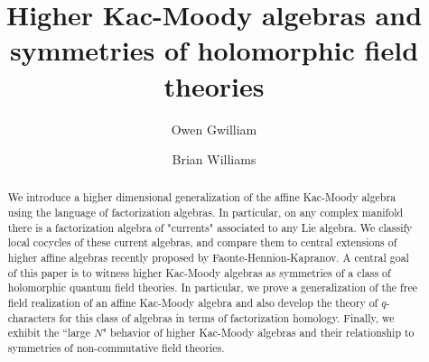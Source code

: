 \documentclass[11pt]{amsart}
\numberwithin{equation}{section}
\begin{document}
\title{Higher Kac-Moody algebras and symmetries of holomorphic field theories}

\author{Owen Gwilliam}
\address{Department of Mathematics and Statistics \\
Lederle Graduate Research Tower, 1623D \\
University of Massachusetts Amherst \\
710 N. Pleasant Street}

\author{Brian Williams}
\address{Department of Mathematics, 
Northeastern University \\ 
567 Lake Hall \\ 
Boston, MA 02115 \\ U.S.A.}


\begin{abstract}
We introduce a higher dimensional generalization of the affine Kac-Moody algebra using the language of factorization algebras. 
In particular, on any complex manifold there is a factorization algebra of "currents" associated to any Lie algebra. 
We classify local cocycles of these current algebras, and compare them to central extensions of higher affine algebras recently proposed by Faonte-Hennion-Kapranov. 
A central goal of this paper is to witness higher Kac-Moody algebras as symmetries of a class of holomorphic quantum field theories. 
In particular, we prove a generalization of the free field realization of an affine Kac-Moody algebra and also develop the theory of $q$-characters for this class of algebras in terms of factorization homology.
Finally, we exhibit the ``large $N$" behavior of higher Kac-Moody algebras and their relationship to symmetries of non-commutative field theories. 
\end{abstract}

\maketitle
\thispagestyle{empty}

\newpage
\tableofcontents

\newpage










%  

\end{document}
